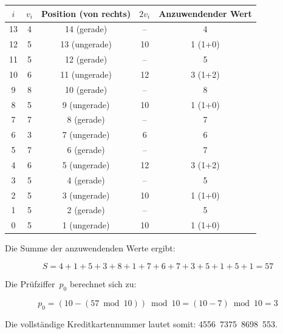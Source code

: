 \begin{center}
\begin{tabular}{|c|c|c|c|c|}
\hline
$i$ & $v_i$ & Position (von rechts) & $2v_i$ & Anzuwendender Wert \\
\hline
13 & 4 & 14 (gerade) & – & 4 \\
12 & 5 & 13 (ungerade) & 10 & 1 (1+0) \\
11 & 5 & 12 (gerade) & – & 5 \\
10 & 6 & 11 (ungerade) & 12 & 3 (1+2) \\
9 & 8 & 10 (gerade) & – & 8 \\
8 & 5 & 9 (ungerade) & 10 & 1 (1+0) \\
7 & 7 & 8 (gerade) & – & 7 \\
6 & 3 & 7 (ungerade) & 6 & 6 \\
5 & 7 & 6 (gerade) & – & 7 \\
4 & 6 & 5 (ungerade) & 12 & 3 (1+2) \\
3 & 5 & 4 (gerade) & – & 5 \\
2 & 5 & 3 (ungerade) & 10 & 1 (1+0) \\
1 & 5 & 2 (gerade) & – & 5 \\
0 & 5 & 1 (ungerade) & 10 & 1 (1+0) \\
\hline
\end{tabular}
\end{center}

Die Summe der anzuwendenden Werte ergibt:

\begin{equation*}
S = 4 + 1 + 5 + 3 + 8 + 1 + 7 + 6 + 7 + 3 + 5 + 1 + 5 + 1 = 57
\end{equation*}

Die Prüfziffer~$p_0$ berechnet sich zu:

\begin{equation*}
p_0 = (10 - (57 \bmod 10)) \bmod 10 = (10 - 7) \bmod 10 = 3
\end{equation*}

Die vollständige Kreditkartennummer lautet somit: 4556\ 7375\ 8698\ 553.